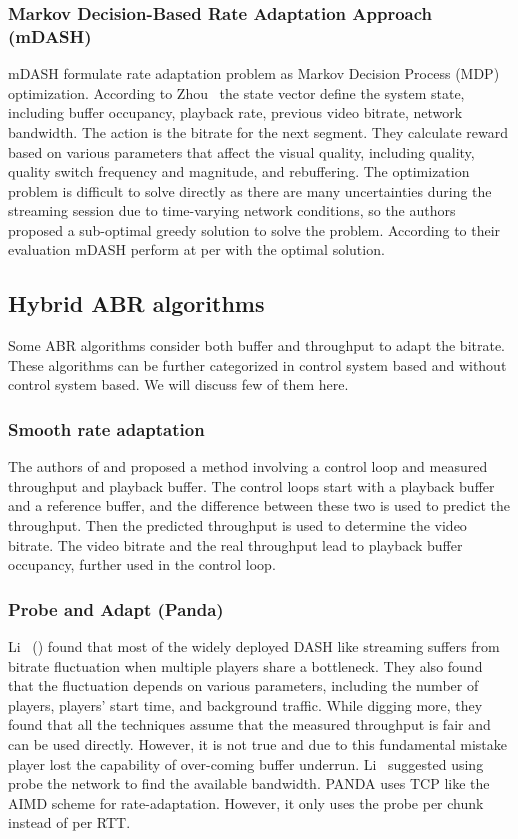 \subsubsection{Markov Decision-Based Rate Adaptation Approach (mDASH)}
mDASH\cite{7393865} formulate rate adaptation problem as Markov Decision Process (MDP)\cite{P-1066} optimization. According to Zhou \etal\, the state vector define the system state, including buffer occupancy, playback rate, previous video bitrate, network bandwidth. The action is the bitrate for the next segment. They calculate reward based on various parameters that affect the visual quality, including quality, quality switch frequency and magnitude, and rebuffering. The optimization problem is difficult to solve directly as there are many uncertainties during the streaming session due to time-varying network conditions, so the authors proposed a sub-optimal greedy solution to solve the problem. According to their evaluation mDASH perform at per with the optimal solution.

\subsection{Hybrid ABR algorithms}
Some ABR algorithms consider both buffer and throughput to adapt the bitrate. These algorithms can be further categorized in control system based and without control system based. We will discuss few of them here.

\subsubsection{Smooth rate adaptation}
The authors of \cite{10.1145/2413176.2413190} and \cite{6694183} proposed a method involving a control loop and measured throughput and playback buffer. The control loops start with a playback buffer and a reference buffer, and the difference between these two is used to predict the throughput. Then the predicted throughput is used to determine the video bitrate. The video bitrate and the real throughput lead to playback buffer occupancy, further used in the control loop.

\subsubsection{Probe and Adapt (Panda)}
Li \etal\ (\cite{140405}) found that most of the widely deployed DASH like streaming suffers from bitrate fluctuation when multiple players share a bottleneck. They also found that the fluctuation depends on various parameters, including the number of players, players' start time, and background traffic. While digging more, they found that all the techniques assume that the measured throughput is fair and can be used directly. However, it is not true and due to this fundamental mistake player lost the capability of over-coming buffer underrun. Li \etal\ suggested using probe the network to find the available bandwidth. PANDA uses TCP like the AIMD scheme for rate-adaptation. However, it only uses the probe per chunk instead of per RTT.

